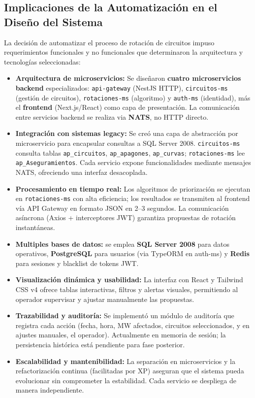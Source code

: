 \subsection{Implicaciones de la Automatización en el Diseño del Sistema}
La decisión de automatizar el proceso de rotación de circuitos impuso requerimientos funcionales y no funcionales que determinaron la arquitectura y tecnologías seleccionadas:

\begin{itemize}
    \item \textbf{Arquitectura de microservicios:} Se diseñaron \textbf{cuatro microservicios backend} especializados: \texttt{api-gateway} (NestJS HTTP), \texttt{circuitos-ms} (gestión de circuitos), \texttt{rotaciones-ms} (algoritmo) y \texttt{auth-ms} (identidad), más el \textbf{frontend} (Next.js/React) como capa de presentación. La comunicación entre servicios backend se realiza via \textbf{NATS}, no HTTP directo.
    
    \item \textbf{Integración con sistemas legacy:} Se creó una capa de abstracción por microservicio para encapsular consultas a SQL Server 2008. \texttt{circuitos-ms} consulta tablas \texttt{ap\_circuitos}, \texttt{ap\_apagones}, \texttt{ap\_curvas}; \texttt{rotaciones-ms} lee \texttt{ap\_Aseguramientos}. Cada servicio expone funcionalidades mediante mensajes NATS, ofreciendo una interfaz desacoplada.
    
    \item \textbf{Procesamiento en tiempo real:} Los algoritmos de priorización se ejecutan en \texttt{rotaciones-ms} con alta eficiencia; los resultados se transmiten al frontend vía API Gateway en formato JSON en 2--3 segundos. La comunicación asíncrona (Axios + interceptores JWT) garantiza propuestas de rotación instantáneas.
    
    \item \textbf{Multiples bases de datos:} se emplea \textbf{SQL Server 2008} para datos operativos, \textbf{PostgreSQL} para usuarios (via TypeORM en auth-ms) y \textbf{Redis} para sesiones y blacklist de tokens JWT.
    
    \item \textbf{Visualización dinámica y usabilidad:} La interfaz con React y Tailwind CSS v4 ofrece tablas interactivas, filtros y alertas visuales, permitiendo al operador supervisar y ajustar manualmente las propuestas.
    
    \item \textbf{Trazabilidad y auditoría:} Se implementó un módulo de auditoría que registra cada acción (fecha, hora, MW afectados, circuitos seleccionados, y en ajustes manuales, el operador). Actualmente en memoria de sesión; la persistencia histórica está pendiente para fase posterior.
    
    \item \textbf{Escalabilidad y mantenibilidad:} La separación en microservicios y la refactorización continua (facilitadas por XP) aseguran que el sistema pueda evolucionar sin comprometer la estabilidad. Cada servicio se despliega de manera independiente.
\end{itemize}

